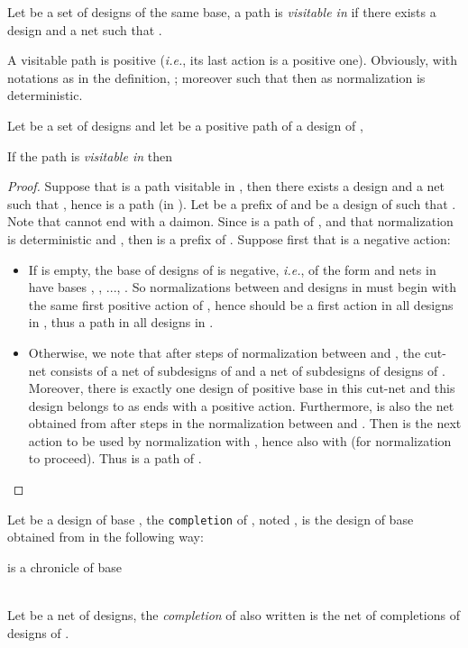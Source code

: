 \documentclass{LMCS}
\def\ie{{\em i.e.}}
\begin{document}
\begin{defi}
Let  be a set of designs of the same base,
a path  is {\em visitable in } if there exists a design  and a net  such that . 
\end{defi}

\rem A visitable path  is positive (\ie, its last action is a positive one). Obviously, with notations as in the definition, ; moreover  such that  then  as normalization is deterministic.

\begin{prop}\label{stabilite-neg}
Let  be a set of designs and let  be a positive path of a design of ,
\begin{center}
If the path  is {\em visitable in } 
then  

\end{center}
\end{prop}
\begin{proof}
Suppose that  is a path visitable in , then there exists a design  and a net  such that , hence  is a path (in ). Let  be a prefix of  and  be a design of  such that . 
Note that  cannot end with a daimon.
Since  is a path of , and that normalization is deterministic and , then  is a prefix of .
Suppose first that  is a negative action:
\begin{itemize}
\item If  is empty, the base of designs of  is negative, \ie, of the form  and nets  in  have bases , , ..., . So normalizations between  and designs in  must begin with the same first positive action  of , hence  should be a first action in all designs in , thus a path in all designs in .
\item Otherwise, we note that after  steps of normalization between  and , the cut-net consists of a net  of subdesigns of  and a net  of subdesigns of designs of . Moreover, there is exactly one design of positive base in this cut-net and this design belongs to  as  ends with a positive action.
Furthermore,  is also the net obtained from  after  steps in the normalization between  and . Then  is the next action to be used by normalization with 
, hence also with  (for normalization to proceed). Thus  is a path of  .\qedhere
\end{itemize}
\end{proof}

\begin{defi}\label{defi:closure}
Let  be a design of base , the {\tt completion} of , noted , is the design of base  obtained from  in the following way:\\
\centerline{
	 is a chronicle of base 
}\\
Let  be a net of designs, the {\em completion} of  also written  is the net of completions of designs of .
\end{defi}
\end{document}
